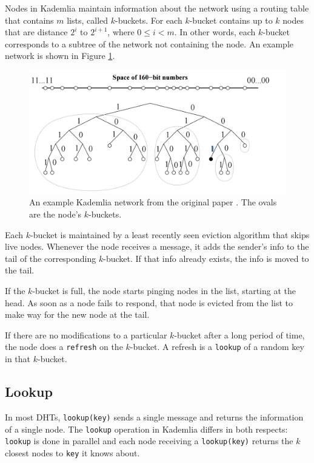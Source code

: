 
Nodes in Kademlia maintain information about the network using a routing table that contains  $m$ lists, called $k$-buckets.
For each $k$-bucket contains up to $k$ nodes that are distance $2^i$ to $2^{i+1}$, where $0 \leq i < m$.
In other words, each $k$-bucket corresponds to a subtree of the network not containing the node.
An example network is shown in Figure \ref{fig:kademlia}.

\begin{figure}
	\centering
	\includegraphics[width=0.7\linewidth]{figs/kademlia}
	\caption{An example Kademlia network from the original paper \cite{kademlia}. The ovals are the node's $k$-buckets.}
	\label{fig:kademlia}
\end{figure}




Each $k$-bucket is maintained by a least recently seen eviction algorithm that skips live nodes.
Whenever the node receives a message, it adds the sender's info to the tail of the corresponding $k$-bucket.
If that info already exists, the info is moved to the tail.

If the $k$-bucket is full, the node starts pinging nodes in the list, starting at the head.
As soon as a node fails to respond, that node is evicted from the list to make way for the new node at the tail.

If there are no modifications to a particular $k$-bucket after a long period of time, the node does a \texttt{refresh} on the $k$-bucket.
A refresh is a \texttt{lookup} of a random key in that $k$-bucket.



\subsection*{Lookup}
In most DHTs, \texttt{lookup(key)} sends a single message and returns the information  of a single node.
The \texttt{lookup} operation in Kademlia differs in both respects:  \texttt{lookup} is done in parallel and each node receiving  a \texttt{lookup(key)} returns the $k$ closest nodes to \texttt{key} it knows about.


